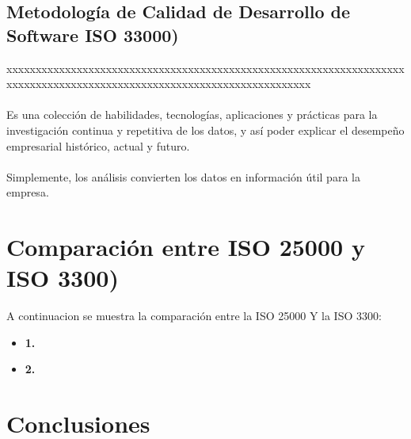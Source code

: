 \documentclass[preprint,12pt]{elsarticle}
\begin{document}
	\subsection{\textbf{Metodología de Calidad de Desarrollo de Software ISO 33000) }}
	xxxxxxxxxxxxxxxxxxxxxxxxxxxxxxxxxxxxxxxxxxxxxxxxxxxxxxxxxxxxxxxxxxxxxxxxxxxxxxxxxxxxxxxxxxxxxxxxxxxxxxxxxxxxxxxxxxxxxxxx \\\\
Es una colección de habilidades, tecnologías, aplicaciones y prácticas para la investigación continua y repetitiva de los datos, y así poder explicar el desempeño empresarial histórico, actual y futuro. \\
\\Simplemente, los análisis convierten los datos en información útil para la empresa.



\section{Comparación entre ISO 25000 y ISO 3300)}
A continuacion se muestra la comparación entre la ISO 25000 Y la ISO 3300:
	
	\begin{itemize}

	\item{\textbf{1.}} 
	\item{\textbf{2.}} 
\end{itemize}


\section{Conclusiones}


	\newpage
	
		
\end{document}
